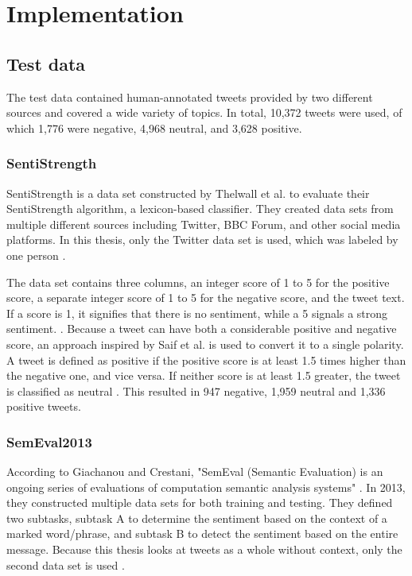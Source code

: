 \chapter{Implementation}
\label{cha:Chapter5_Implementation}
\section{Test data}
The test data contained human-annotated tweets provided by two different sources and covered a wide variety of topics. In total, 10,372 tweets were used, of which 1,776 were negative, 4,968 neutral, and 3,628 positive.

\subsection{SentiStrength}
SentiStrength is a data set constructed by Thelwall et al. to evaluate their SentiStrength algorithm, a lexicon-based classifier. They created data sets from multiple different sources including Twitter, BBC Forum, and other social media platforms. In this thesis, only the Twitter data set is used, which was labeled by one person \cite{10.1002/asi.21662}.

The data set contains three columns, an integer score of 1 to 5 for the positive score, a separate integer score of 1 to 5 for the negative score, and the tweet text. If a score is 1, it signifies that there is no sentiment, while a 5 signals a strong sentiment. \cite{10.1002/asi.21662}. Because a tweet can have both a considerable positive and negative score, an approach inspired by Saif et al. is used to convert it to a single polarity. A tweet is defined as positive if the positive score is at least 1.5 times higher than the negative one, and vice versa. If neither score is at least 1.5 greater, the tweet is classified as neutral \cite{oro40660}. This resulted in 947 negative, 1,959 neutral and 1,336 positive tweets.


\subsection{SemEval2013}
According to Giachanou and Crestani, "SemEval (Semantic Evaluation) is an ongoing series of evaluations of computation semantic analysis systems" \cite[p.~28:31]{DBLP:journals/csur/GiachanouC16}. In 2013, they constructed multiple data sets for both training and testing. They defined two subtasks, subtask A to determine the sentiment based on the context of a marked word/phrase, and subtask B to detect the sentiment based on the entire message. Because this thesis looks at tweets as a whole without context, only the second data set is used \cite{nakov-etal-2013-semeval}.

